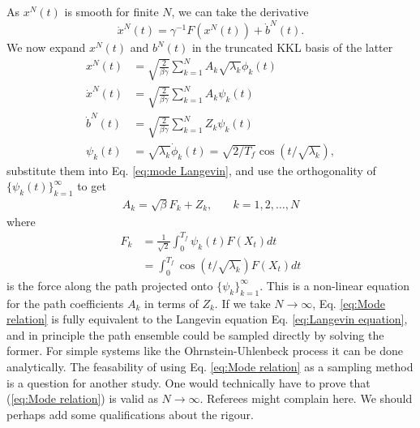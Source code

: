 As $x^N(t)$ is smooth for finite $N$, we can take the derivative
\begin{equation} \label{eq:mode Langevin}
\dot{x}^N(t) = \gamma^{-1} F(x^N(t)) + \dot{b}^N(t).
\end{equation}
We now expand $x^N(t)$ and $b^N(t)$ in the truncated KKL basis of the latter
\begin{subequations}
\begin{align}
x^N(t) & = \sqrt{\frac{2}{\beta \gamma}} \sum_{k=1}^N A_k \sqrt{\lambda_k} \phi_k(t) \\
\dot{x}^N(t) & = \sqrt{\frac{2}{\beta \gamma}} \sum_{k=1}^N A_k \psi_k(t) \\
\dot{b}^N(t) & = \sqrt{\frac{2}{\beta \gamma}} \sum_{k=1}^N Z_k \psi_k(t) \\
\psi_k(t) & = \sqrt{\lambda_k} \dot{\phi}_k(t) = \sqrt{2/T_f} \cos(t / \sqrt{\lambda_k}),
\end{align}
\end{subequations}
substitute them into Eq. \ref{eq:mode Langevin}, and use the orthogonality of $\{\psi_k(t)\}_{k=1}^{\infty}$ to get
\begin{equation} \label{eq:Mode relation}
\begin{aligned}
A_k = \sqrt{\beta} F_k + Z_k, \quad & k=1,2, \dots, N
\end{aligned}
\end{equation}
where
\begin{equation} \label{eq:Force modes}
\begin{aligned}
F_k & = \frac{1}{\sqrt{2}} \int_0^{T_f} \psi_k(t) F(X_t) dt \\
    & = \int_0^{T_f} \cos(t/\sqrt{\lambda_k}) F(X_t) dt
\end{aligned}
\end{equation}
is the force along the path projected onto $\{\psi_k\}_{k=1}^\infty$. This is a non-linear equation for the path coefficients $A_k$ in terms of $Z_k$. If we take $N \to \infty$, Eq. \ref{eq:Mode relation} is fully equivalent to the Langevin equation Eq. \ref{eq:Langevin equation}, and in principle the path ensemble could be sampled directly by solving the former. For simple systems like the Ohrnstein-Uhlenbeck process it can be done analytically. The feasability of using Eq. \ref{eq:Mode relation} as a sampling method is a question for another study. {\color{red} One would technically have to prove that (\ref{eq:Mode relation}) is valid as $N \to \infty$. Referees might complain here. We should perhaps add some qualifications about the rigour.}

